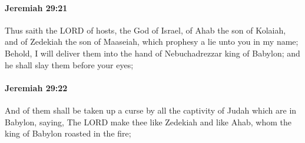 		\paragraph{Jeremiah 29:21} %
			\label{JEREMIAH-29-21}

			Thus saith the LORD of hosts, the God of Israel, of Ahab the son of Kolaiah, and of Zedekiah the son of Maaseiah, which prophesy a lie unto you in my name; Behold, I will deliver them into the hand of Nebuchadrezzar king of Babylon; and he shall slay them before your eyes;


		\paragraph{Jeremiah 29:22} %
			\label{JEREMIAH-29-22}

			And of them shall be taken up a curse by all the captivity of Judah which are in Babylon, saying, The LORD make thee like Zedekiah and like Ahab, whom the king of Babylon roasted in the fire;

